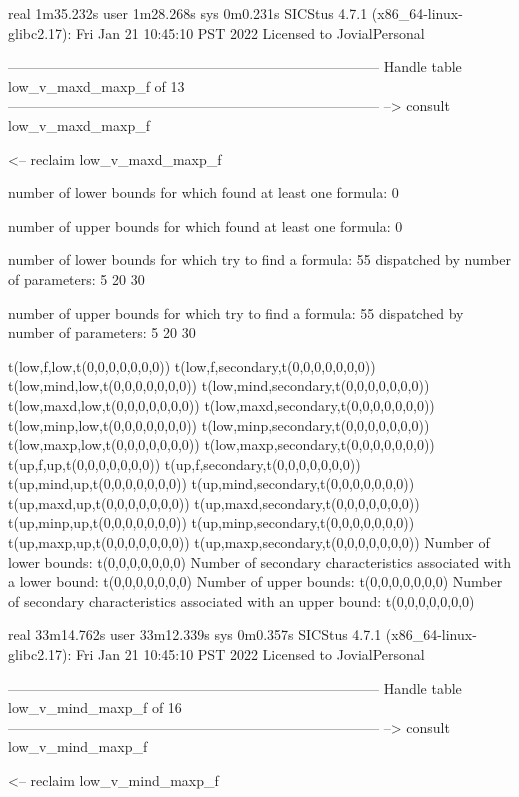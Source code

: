 real	1m35.232s
user	1m28.268s
sys	0m0.231s
SICStus 4.7.1 (x86_64-linux-glibc2.17): Fri Jan 21 10:45:10 PST 2022
Licensed to JovialPersonal


--------------------------------------------------------------------------------
Handle table low_v_maxd_maxp_f of 13
--------------------------------------------------------------------------------
--> consult low_v_maxd_maxp_f

<-- reclaim low_v_maxd_maxp_f

number of lower bounds for which found at least one formula: 0

number of upper bounds for which found at least one formula: 0

number of lower bounds for which try to find a formula: 55
dispatched by number of parameters: 5  20  30

number of upper bounds for which try to find a formula: 55
dispatched by number of parameters: 5  20  30

t(low,f,low,t(0,0,0,0,0,0,0))
t(low,f,secondary,t(0,0,0,0,0,0,0))
t(low,mind,low,t(0,0,0,0,0,0,0))
t(low,mind,secondary,t(0,0,0,0,0,0,0))
t(low,maxd,low,t(0,0,0,0,0,0,0))
t(low,maxd,secondary,t(0,0,0,0,0,0,0))
t(low,minp,low,t(0,0,0,0,0,0,0))
t(low,minp,secondary,t(0,0,0,0,0,0,0))
t(low,maxp,low,t(0,0,0,0,0,0,0))
t(low,maxp,secondary,t(0,0,0,0,0,0,0))
t(up,f,up,t(0,0,0,0,0,0,0))
t(up,f,secondary,t(0,0,0,0,0,0,0))
t(up,mind,up,t(0,0,0,0,0,0,0))
t(up,mind,secondary,t(0,0,0,0,0,0,0))
t(up,maxd,up,t(0,0,0,0,0,0,0))
t(up,maxd,secondary,t(0,0,0,0,0,0,0))
t(up,minp,up,t(0,0,0,0,0,0,0))
t(up,minp,secondary,t(0,0,0,0,0,0,0))
t(up,maxp,up,t(0,0,0,0,0,0,0))
t(up,maxp,secondary,t(0,0,0,0,0,0,0))
Number of lower bounds:                                             t(0,0,0,0,0,0,0)
Number of secondary characteristics associated with a lower bound:  t(0,0,0,0,0,0,0)
Number of upper bounds:                                             t(0,0,0,0,0,0,0)
Number of secondary characteristics associated with an upper bound: t(0,0,0,0,0,0,0)

real	33m14.762s
user	33m12.339s
sys	0m0.357s
SICStus 4.7.1 (x86_64-linux-glibc2.17): Fri Jan 21 10:45:10 PST 2022
Licensed to JovialPersonal


--------------------------------------------------------------------------------
Handle table low_v_mind_maxp_f of 16
--------------------------------------------------------------------------------
--> consult low_v_mind_maxp_f

<-- reclaim low_v_mind_maxp_f

